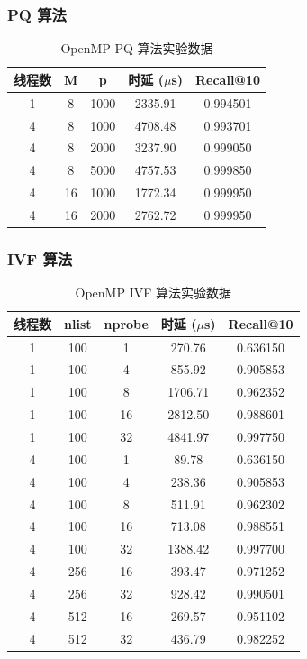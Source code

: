 \documentclass[a4paper]{article}
\begin{document}
\subsubsection{PQ 算法}

\begin{table}[H]
\centering
\caption{OpenMP PQ 算法实验数据}
\begin{tabular}{ccccc}
\toprule
线程数 & M & p & 时延 ($\mu$s) & Recall@10 \\
\midrule
1 & 8 & 1000 & 2335.91 & 0.994501 \\
4 & 8 & 1000 & 4708.48 & 0.993701 \\
4 & 8 & 2000 & 3237.90 & 0.999050 \\
4 & 8 & 5000 & 4757.53 & 0.999850 \\
4 & 16 & 1000 & 1772.34 & 0.999950 \\
4 & 16 & 2000 & 2762.72 & 0.999950 \\
\bottomrule
\end{tabular}
\end{table}

\subsubsection{IVF 算法}

\begin{table}[H]
\centering
\caption{OpenMP IVF 算法实验数据}
\begin{tabular}{ccccc}
\toprule
线程数 & nlist & nprobe & 时延 ($\mu$s) & Recall@10 \\
\midrule
1 & 100 & 1 & 270.76 & 0.636150 \\
1 & 100 & 4 & 855.92 & 0.905853 \\
1 & 100 & 8 & 1706.71 & 0.962352 \\
1 & 100 & 16 & 2812.50 & 0.988601 \\
1 & 100 & 32 & 4841.97 & 0.997750 \\
4 & 100 & 1 & 89.78 & 0.636150 \\
4 & 100 & 4 & 238.36 & 0.905853 \\
4 & 100 & 8 & 511.91 & 0.962302 \\
4 & 100 & 16 & 713.08 & 0.988551 \\
4 & 100 & 32 & 1388.42 & 0.997700 \\
4 & 256 & 16 & 393.47 & 0.971252 \\
4 & 256 & 32 & 928.42 & 0.990501 \\
4 & 512 & 16 & 269.57 & 0.951102 \\
4 & 512 & 32 & 436.79 & 0.982252 \\
\bottomrule
\end{tabular}
\end{table}
\end{document}
